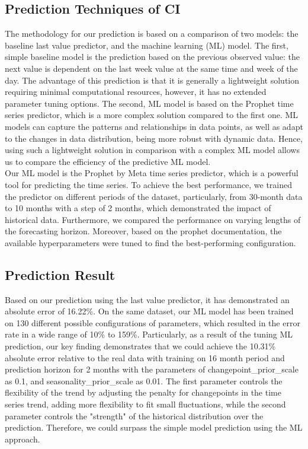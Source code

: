 \subsection{Prediction Techniques of CI}
The methodology for our prediction is based on a comparison of two models: the baseline last value predictor, and the machine learning (ML) model. 
The first, simple baseline model is the prediction based on the previous observed value: the next value is dependent on the last week value at the same time and week of the day. 
The advantage of this prediction is that it is generally a lightweight solution requiring minimal computational resources, however, it has no extended parameter tuning options. 
The second, ML model is based on the Prophet time series predictor, which is a more complex solution compared to the first one. 
ML models can capture the patterns and relationships in data points, as well as adapt to the changes in data distribution, being more robust with dynamic data. 
Hence, using such a lightweight solution in comparison with a complex ML model allows us to compare the efficiency of the predictive ML model. 
\\
Our ML model is the Prophet by Meta time series predictor, which is a powerful tool for predicting the time series. 
To achieve the best performance, we trained the predictor on different periods of the dataset, particularly, from 30-month data to 10 months with a step of 2 months, which demonstrated the impact of historical data. 
Furthermore, we compared the performance on varying lengths of the forecasting horizon. 
Moreover, based on the prophet documentation, the available hyperparameters were tuned to find the best-performing configuration. 

\subsection{Prediction Result}
Based on our prediction using the last value predictor, it has demonstrated an absolute error of 16.22\%. 
On the same dataset, our ML model has been trained on 130 different possible configurations of parameters, which resulted in the error rate in a wide range of 10\% to 159\%. Particularly, as a result of the tuning ML prediction, our key finding demonstrates that we could achieve the 10.31\% absolute error relative to the real data with training on 16 month period and prediction horizon for 2 months with the parameters of changepoint\_prior\_scale as 0.1, and seasonality\_prior\_scale as 0.01.  The first parameter controls the flexibility of the trend by adjusting the penalty for changepoints in the time series trend, adding more flexibility to fit small fluctuations, while the second parameter controls the "strength" of the historical distribution over the prediction. 
Therefore, we could surpass the simple model prediction using the ML approach. 

